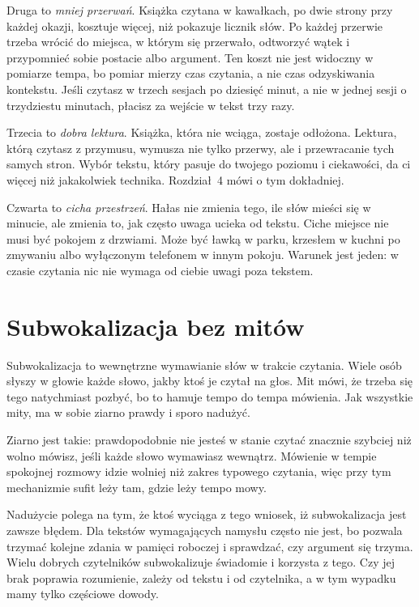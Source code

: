 Druga to \emph{mniej przerwań}. Książka czytana w kawałkach, po dwie strony przy każdej okazji, kosztuje więcej, niż pokazuje licznik słów. Po każdej przerwie trzeba wrócić do miejsca, w którym się przerwało, odtworzyć wątek i przypomnieć sobie postacie albo argument. Ten koszt nie jest widoczny w pomiarze tempa, bo pomiar mierzy czas czytania, a nie czas odzyskiwania kontekstu. Jeśli czytasz w trzech sesjach po dziesięć minut, a nie w jednej sesji o trzydziestu minutach, płacisz za wejście w tekst trzy razy.

Trzecia to \emph{dobra lektura}. Książka, która nie wciąga, zostaje odłożona. Lektura, którą czytasz z przymusu, wymusza nie tylko przerwy, ale i przewracanie tych samych stron. Wybór tekstu, który pasuje do twojego poziomu i ciekawości, da ci więcej niż jakakolwiek technika. Rozdział~4 mówi o tym dokładniej.

Czwarta to \emph{cicha przestrzeń}. Hałas nie zmienia tego, ile słów mieści się w minucie, ale zmienia to, jak często uwaga ucieka od tekstu. Ciche miejsce nie musi być pokojem z drzwiami. Może być ławką w parku, krzesłem w kuchni po zmywaniu albo wyłączonym telefonem w innym pokoju. Warunek jest jeden: w czasie czytania nic nie wymaga od ciebie uwagi poza tekstem.

\section{Subwokalizacja bez mitów}

Subwokalizacja to wewnętrzne wymawianie słów w trakcie czytania. Wiele osób słyszy w głowie każde słowo, jakby ktoś je czytał na głos. Mit mówi, że trzeba się tego natychmiast pozbyć, bo to hamuje tempo do tempa mówienia. Jak wszystkie mity, ma w sobie ziarno prawdy i sporo nadużyć.

Ziarno jest takie: prawdopodobnie nie jesteś w stanie czytać znacznie szybciej niż wolno mówisz, jeśli każde słowo wymawiasz wewnątrz. Mówienie w tempie spokojnej rozmowy idzie wolniej niż zakres typowego czytania, więc przy tym mechanizmie sufit leży tam, gdzie leży tempo mowy.

Nadużycie polega na tym, że ktoś wyciąga z tego wniosek, iż subwokalizacja jest zawsze błędem. Dla tekstów wymagających namysłu często nie jest, bo pozwala trzymać kolejne zdania w pamięci roboczej i sprawdzać, czy argument się trzyma. Wielu dobrych czytelników subwokalizuje świadomie i korzysta z tego. Czy jej brak poprawia rozumienie, zależy od tekstu i od czytelnika, a w tym wypadku mamy tylko częściowe dowody.

